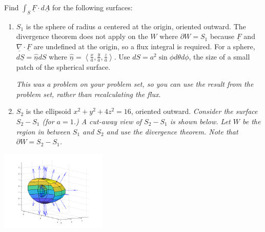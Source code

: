 \documentclass[12pt,letterpaper,noanswers]{exam}
\newcommand{\mb}[1]{\underline{#1}}
\begin{document}
Find $\displaystyle\int_S \mb F\cdot d\mb A$ for the following surfaces:
\begin{enumerate}
    \item $S_1$ is the sphere of radius $a$ centered at the origin, oriented outward.  The divergence theorem does not apply on the $W$ where $\partial W = S_1$ because $\mb F$ and $\mb\nabla \cdot \mb F$ are undefined at the origin, so a flux integral is required.  For a sphere, $d\underline S = \hat{\underline n} dS$ where $\hat{\underline n} = \left\langle \frac{x}{a},\frac{y}{a},\frac{z}{a}\right\rangle$. Use $dS = a^2\sin\phi d\theta d\phi$, the size of a small patch of the spherical surface.


\emph{This was a problem on your problem set, so you can use the result from the problem set, rather than recalculating the flux}.

    \item $S_2$ is the ellipsoid $x^2+y^2+4z^2 = 16$, oriented outward.  \emph{Consider the surface $S_2 - S_1$ (for $a = 1$.)  A cut-away view of $S_2 - S_1$ is shown below.  Let $W$ be the region in between $S_1$ and $S_2$ and use the divergence theorem.  Note that $\partial W = S_2 - S_1$.}

\end{enumerate}

\includegraphics[width=2in]{img/C32p4-18.png}
    \vspace{1.5in}

\eject

\end{document}

